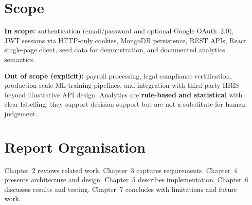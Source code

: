 \section{Scope}
\textbf{In scope:} authentication (email/password and optional Google OAuth~2.0), JWT sessions via HTTP-only cookies, MongoDB persistence, REST APIs, React single-page client, seed data for demonstration, and documented analytics semantics.

\textbf{Out of scope (explicit):} payroll processing, legal compliance certification, production-scale ML training pipelines, and integration with third-party HRIS beyond illustrative API design. Analytics are \textbf{rule-based and statistical} with clear labelling; they support decision support but are not a substitute for human judgement.

\section{Report Organisation}
Chapter~2 reviews related work. Chapter~3 captures requirements. Chapter~4 presents architecture and design. Chapter~5 describes implementation. Chapter~6 discusses results and testing. Chapter~7 concludes with limitations and future work.
